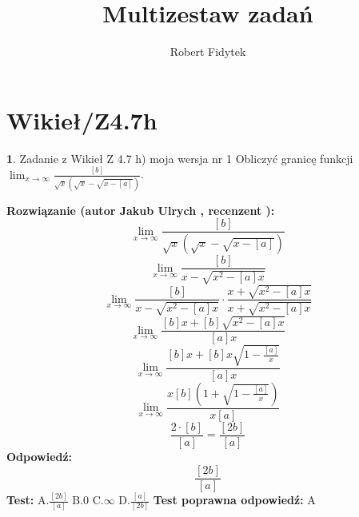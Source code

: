 \documentclass[12pt, a4paper]{article}
\title{Multizestaw zadań}
\author{Robert Fidytek}
\date{}
\theoremstyle{definition} %
\newtheorem{zad}{}
\newcommand{\kategoria}[1]{\section{#1}} %
\newcommand{\zadStart}[1]{\begin{zad}#1\newline} %
\newcommand{\zadStop}{\end{zad}}   %
\newcommand{\rozwStart}[2]{\noindent \textbf{Rozwiązanie (autor #1 , recenzent #2): }\newline} %
\newcommand{\rozwStop}{\newline}                                            %
\newcommand{\odpStart}{\noindent \textbf{Odpowiedź:}\newline}    %
\newcommand{\odpStop}{\newline}                                             %
\newcommand{\testStart}{\noindent \textbf{Test:}\newline} %
\newcommand{\testStop}{\newline} %
\newcommand{\kluczStart}{\noindent \textbf{Test poprawna odpowiedź:}\newline} %
\newcommand{\kluczStop}{\newline} %
\begin{document}
\maketitle


\kategoria{Wikieł/Z4.7h}
\zadStart{Zadanie z Wikieł Z 4.7 h) moja wersja nr 1}
Obliczyć granicę funkcji $\lim_{x \to \infty}\frac{[b]}{\sqrt{x}(\sqrt{x}-\sqrt{x-[a]})}$.
\zadStop
\rozwStart{Jakub Ulrych}{}
$$\lim_{x \to \infty}\frac{[b]}{\sqrt{x}(\sqrt{x}-\sqrt{x-[a]})}$$
$$\lim_{x \to \infty}\frac{[b]}{x-\sqrt{x^{2}-[a]x}}$$
$$\lim_{x \to \infty}\frac{[b]}{x-\sqrt{x^{2}-[a]x}}\cdot\frac{x+\sqrt{x^{2}-[a]x}}{x+\sqrt{x^{2}-[a]x}}$$
$$\lim_{x \to \infty}\frac{[b]x+[b]\sqrt{x^{2}-[a]x}}{[a]x}$$
$$\lim_{x \to \infty}\frac{[b]x+[b]x\sqrt{1-\frac{[a]}{x}}}{[a]x}$$
$$\lim_{x \to \infty}\frac{x[b](1+\sqrt{1-\frac{[a]}{x}})}{x[a]}$$
$$\frac{2\cdot[b]}{[a]}=\frac{[2b]}{[a]}$$
\rozwStop
\odpStart
$$\frac{[2b]}{[a]}$$
\odpStop
\testStart
A.$\frac{[2b]}{[a]}$
B.$0$
C.$\infty$
D.$\frac{[a]}{[2b]}$
\testStop
\kluczStart
A
\kluczStop
\end{document}
